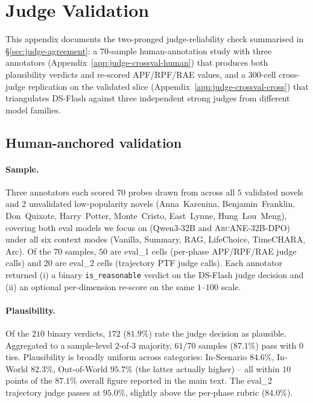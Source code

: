 \documentclass[11pt]{article}
\newcommand{\ours}{\textsc{ArcANE}}
\begin{document}
\section{Judge Validation\label{app:judge-crossval}}

This appendix documents the two-pronged judge-reliability check summarised in \S\ref{sec:judge-agreement}: a $70$-sample human-annotation study with three annotators (Appendix~\ref{app:judge-crossval-human}) that produces both plausibility verdicts and re-scored APF/RPF/RAE values, and a $300$-cell cross-judge replication on the validated slice (Appendix~\ref{app:judge-crossval-cross}) that triangulates DS-Flash against three independent strong judges from different model families.

\subsection{Human-anchored validation\label{app:judge-crossval-human}}

\paragraph{Sample.} Three annotators each scored $70$ probes drawn from across all $5$ validated novels and $2$ unvalidated low-popularity novels (Anna~Karenina, Benjamin~Franklin, Don~Quixote, Harry~Potter, Monte~Cristo, East~Lynne, Hung~Lou~Meng), covering both eval models we focus on (Qwen3-32B and \ours{}-32B-DPO) under all six context modes (Vanilla, Summary, RAG, LifeChoice, TimeCHARA, Arc). Of the $70$ samples, $50$ are eval\_1 cells (per-phase APF/RPF/RAE judge calls) and $20$ are eval\_2 cells (trajectory PTF judge calls). Each annotator returned (i) a binary \texttt{is\_reasonable} verdict on the DS-Flash judge decision and (ii) an optional per-dimension re-score on the same $1$--$100$ scale.

\paragraph{Plausibility.} Of the $210$ binary verdicts, $172$ ($81.9\%$) rate the judge decision as plausible. Aggregated to a sample-level $2$-of-$3$ majority, $61 / 70$ samples ($87.1\%$) pass with $0$ ties. Plausibility is broadly uniform across categories: In-Scenario $84.6\%$, In-World $82.3\%$, Out-of-World $95.7\%$ (the latter actually higher) -- all within $10$ points of the $87.1\%$ overall figure reported in the main text. The eval\_2 trajectory judge passes at $95.0\%$, slightly above the per-phase rubric ($84.0\%$).
\end{document}
